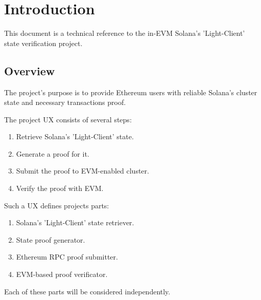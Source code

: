 \chapter{Introduction}

This document is a technical reference to the in-EVM Solana's 'Light-Client'
state verification project.

\section{Overview}

The project's purpose is to provide Ethereum users with reliable Solana's
cluster state and necessary transactions proof.

The project UX consists of several steps:
\begin{enumerate}
    \item Retrieve Solana's 'Light-Client' state.
    \item Generate a proof for it.
    \item Submit the proof to EVM-enabled cluster.
    \item Verify the proof with EVM.
\end{enumerate}

Such a UX defines projects parts:
\begin{enumerate}
    \item Solana's 'Light-Client' state retriever.
    \item State proof generator.
    \item Ethereum RPC proof submitter.
    \item EVM-based proof verificator.
\end{enumerate}

Each of these parts will be considered independently.

